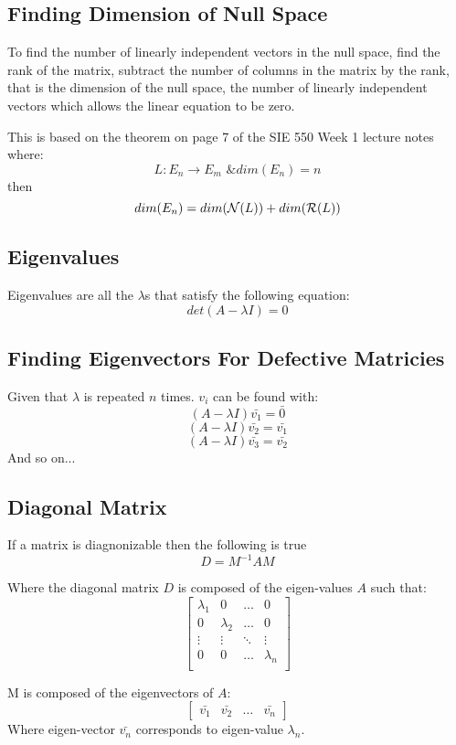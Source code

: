 \documentclass[12pt]{article}
\begin{document}
\subsection*{Finding Dimension of Null Space}
To find the number of linearly independent vectors in the null space, find the rank of the matrix, subtract the number of columns in the matrix by the rank, that is the dimension of the null space, the number of linearly independent vectors which allows the linear equation to be zero.

This is based on the theorem on page 7 of the SIE 550 Week 1 lecture notes where:
$$L:E_n \rightarrow E_m \text{ \& } dim(E_n)=n$$
then 
$$dim(E_n)=dim({\cal N}(L))+dim({\cal R}(L))$$

\subsection*{Eigenvalues}
Eigenvalues are all the $\lambda$s that satisfy the following equation:
$$det(A-\lambda I)=0$$

\subsection*{Finding Eigenvectors For Defective Matricies}
Given that $\lambda$ is repeated $n$ times. $v_i$ can be found with:
$$(A-\lambda I)\bar{v_1}=\bar{0}$$
$$(A-\lambda I)\bar{v_2}=\bar{v_1}$$
$$(A-\lambda I)\bar{v_3}=\bar{v_2}$$
And so on...

\subsection*{Diagonal Matrix}
If a matrix is diagnonizable then the following is true
$$
D=M^{-1}AM
$$

\noindent
Where the diagonal matrix $D$ is composed of the eigen-values $A$ such that:
$$
\begin{bmatrix}
	\lambda_1 & 0 & \dots & 0 \\
	0 & \lambda_2 & \dots & 0 \\
	\vdots & \vdots & \ddots & \vdots \\
	0 & 0 & \dots & \lambda_n \\
\end{bmatrix}
$$

\noindent 
M is composed of the eigenvectors of $A$:
$$
\begin{bmatrix}
	\bar{v_1} & \bar{v_2} & \dots & \bar{v_n}
\end{bmatrix}
$$
\noindent
Where eigen-vector $\bar{v_n}$ corresponds to eigen-value $\lambda_n$.
\end{document}
